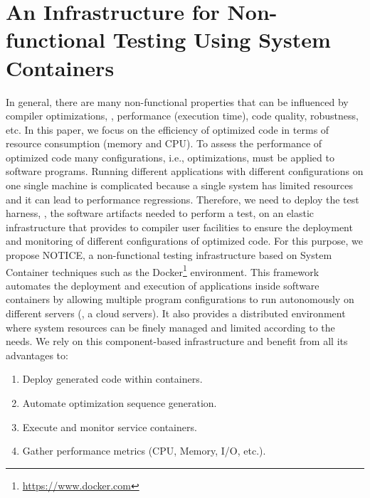\section{An Infrastructure for Non-functional Testing Using System Containers}
In general, there are many non-functional properties that can be influenced by compiler optimizations, \eg, performance (execution time), code quality, robustness, etc. 
In this paper, we focus on the efficiency of optimized code in terms of resource consumption (memory and CPU). 
To assess the performance of optimized code many configurations, i.e., optimizations, must be applied to software programs. Running different applications with different configurations on one single machine is complicated because a single system has limited resources and it can lead to performance regressions. 
Therefore, we need to deploy the test harness, \ie, the software artifacts needed to perform a test, on an elastic infrastructure that provides to compiler user facilities to ensure the deployment and monitoring of different configurations of optimized code. 
For this purpose, we propose NOTICE, a non-functional testing infrastructure based on System Container techniques such as the Docker\footnote{\url{https://www.docker.com}} environment. 
This framework automates the deployment and execution of applications inside software containers by allowing multiple program configurations to run autonomously on different servers (\ie, a cloud servers). It also provides a distributed environment where system resources can be finely managed and limited according to the needs. 
We rely on this component-based infrastructure and benefit from all its advantages to:
\begin{enumerate}
	\item Deploy generated code within containers.
	\item Automate optimization sequence generation.
	\item Execute and monitor service containers.
	\item Gather performance metrics (CPU, Memory, I/O, etc.).
\end{enumerate}


